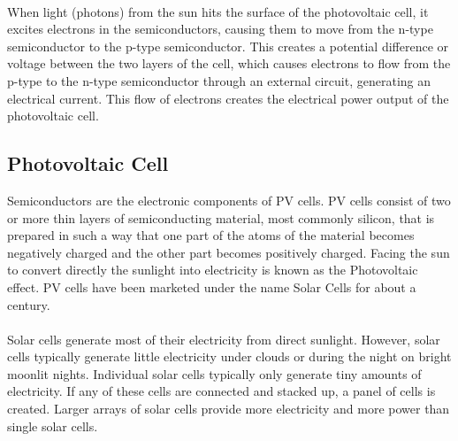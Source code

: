 \documentclass{report}
\begin{document}
\\
When light (photons) from the sun hits the surface of the photovoltaic cell, it excites electrons in the semiconductors, causing them to move from the n-type semiconductor to the p-type semiconductor. This creates a potential difference or voltage between the two layers of the cell, which causes electrons to flow from the p-type to the n-type semiconductor through an external circuit, generating an electrical current. This flow of electrons creates the electrical power output of the photovoltaic cell.



\subsection{Photovoltaic Cell}
Semiconductors are the electronic components of PV cells. PV cells consist of two or more thin layers of semiconducting material, most commonly silicon, that is prepared in such a way that one part of the atoms of the material becomes negatively charged and the other part becomes positively charged.  Facing the sun to convert directly the sunlight into electricity is known as the Photovoltaic effect. PV cells have been marketed under the name Solar Cells for about a century.\\
\\
Solar cells generate most of their electricity from direct sunlight. However, solar cells typically generate little electricity under clouds or during the night on bright moonlit nights. Individual solar cells typically only generate tiny amounts of electricity. If any of these cells are connected and stacked up, a panel of cells is created. Larger arrays of solar cells provide more electricity and more power than single solar cells.
\end{document}
